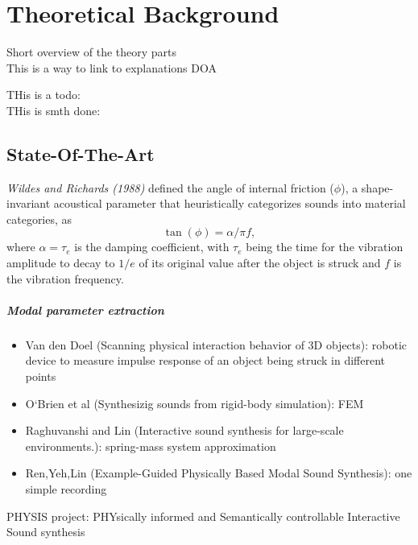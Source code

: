 \chapter{Theoretical Background}\label{ch:theory}
Short overview of the theory parts\\
This is a way to link to explanations \gls{DOA} 

THis is a todo: 
\\
THis is smth done:
\done{}

\section{State-Of-The-Art}\label{sec:state_art}
\textit{Wildes and Richards (1988)} defined the angle of internal friction ($\phi$), a shape-invariant acoustical parameter that heuristically categorizes sounds into material categories, as
\begin{equation}\label{eq:tanf}
\tan(\phi) = \alpha / \pi f,
\end{equation}
where $\alpha = \tau_e$ is the damping coefficient, with $\tau_e$ being the time for the vibration amplitude to decay to $1/e$ of its original value after the object is struck  and $f$ is the vibration frequency\cite{giordano2006material}.

\paragraph{Modal parameter extraction\\}
\begin{itemize}
\item Van den Doel (Scanning physical interaction behavior of 3D objects): robotic device to measure impulse response of an object being struck in different points
\item  O`Brien et al (Synthesizig sounds from rigid-body simulation): FEM
\item Raghuvanshi and Lin (Interactive sound synthesis for large-scale environments.): spring-mass system approximation
\item Ren,Yeh,Lin (Example-Guided Physically Based Modal Sound Synthesis): one simple recording

\end{itemize}

\item PHYSIS project: PHYsically informed and Semantically controllable
Interactive Sound synthesis

